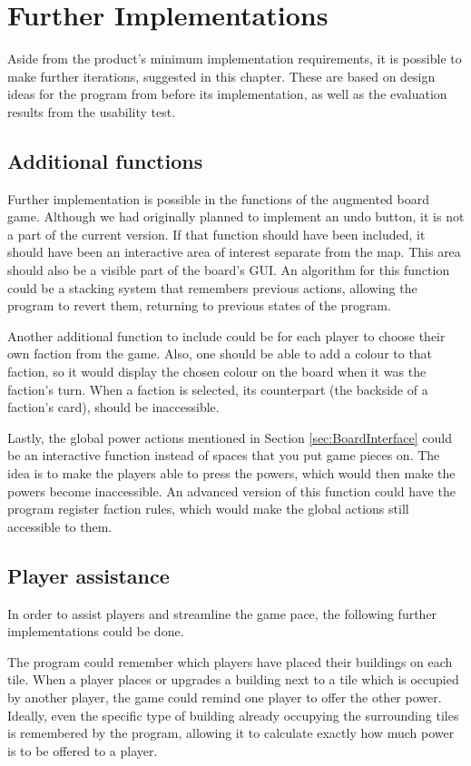 \chapter{Further Implementations}\label{ch:furthimp}
Aside from the product's minimum implementation requirements, it is possible to make further iterations, suggested in this chapter. These are based on design ideas for the program from before its implementation, as well as the evaluation results from the usability test.

\section{Additional functions}
Further implementation is possible in the functions of the augmented board game. Although we had originally planned to implement an undo button, it is not a part of the current version. If that function should have been included, it should have been an interactive area of interest separate from the map. This area should also be a visible part of the board’s GUI. An algorithm for this function could be a stacking system that remembers previous actions, allowing the program to revert them, returning to previous states of the program.

Another additional function to include could be for each player to choose their own faction from the game. Also, one should be able to add a colour to that faction, so it would display the chosen colour on the board when it was the faction’s turn. When a faction is selected, its counterpart (the backside of a faction’s card), should be inaccessible.

Lastly, the global power actions mentioned in Section \ref{sec:BoardInterface} could be an interactive function instead of spaces that you put game pieces on. The idea is to make the players able to press the powers, which would then make the powers become inaccessible. An advanced version of this function could have the program register faction rules, which would make the global actions still accessible to them. 

\section{Player assistance}
In order to assist players and streamline the game pace, the following further implementations could be done.

The program could remember which players have placed their buildings on each tile. When a player places or upgrades a building next to a tile which is occupied by another player, the game could remind one player to offer the other power. Ideally, even the specific type of building already occupying the surrounding tiles is remembered by the program, allowing it to calculate exactly how much power is to be offered to a player.

